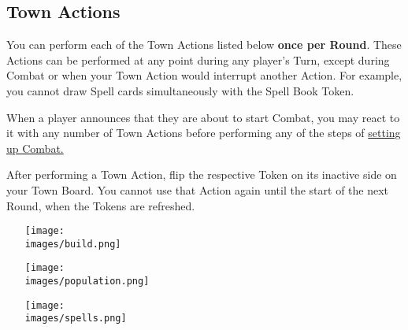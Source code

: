 \begin{multicols}{2}
{  \subsection*{Town Actions}
  You can perform each of the Town Actions listed below \textbf{once per Round}.
  These Actions can be performed at any point during any player's Turn, except during Combat or when your Town Action would interrupt another Action.
  For example, you cannot draw Spell cards simultaneously with the Spell Book Token.\par
  When a player announces that they are about to start Combat, you may react to it with any number of Town Actions before performing any of the steps of \hyperlink{Combatsetup}{setting up Combat.}\par
  After performing a Town Action, flip the respective Token on its inactive side on your Town Board.
  You cannot use that Action again until the start of the next Round, when the Tokens are refreshed.
}
\pl{}
\begin{itemize}
  \item [{\texttt{[image: \\images/build.png]}}]
    \pl{}
  \item [{\texttt{[image: \\images/population.png]}}]
    \pl{}
  \item [{\texttt{[image: \\images/spells.png]}}]
    \pl{}
\end{itemize}

\en{
}
\end{multicols}
